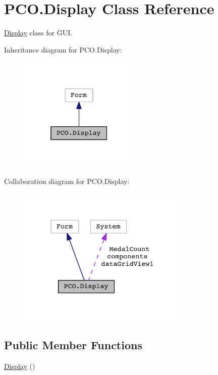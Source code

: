 \hypertarget{classPCO_1_1Display}{}\section{P\+C\+O.\+Display Class Reference}
\label{classPCO_1_1Display}


\hyperlink{classPCO_1_1Display}{Display} class for G\+UI.  




Inheritance diagram for P\+C\+O.\+Display\+:\nopagebreak
\begin{figure}[H]
\begin{center}
\leavevmode
\includegraphics[width=163pt]{classPCO_1_1Display__inherit__graph}
\end{center}
\end{figure}


Collaboration diagram for P\+C\+O.\+Display\+:\nopagebreak
\begin{figure}[H]
\begin{center}
\leavevmode
\includegraphics[width=234pt]{classPCO_1_1Display__coll__graph}
\end{center}
\end{figure}
\subsection*{Public Member Functions}
\begin{DoxyCompactItemize}
\item 
\hyperlink{classPCO_1_1Display_a7c80a0fdb334c85d8226c1be9a8799e7}{Display} ()
\end{DoxyCompactItemize}
